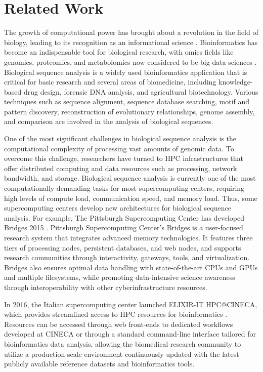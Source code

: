 \documentclass[conference]{IEEEtran}
\begin{document}
\section*{\textbf{Related Work}}
The growth of computational power has brought about a revolution in the field of biology, leading to its recognition as an informational science \cite{b4}. Bioinformatics has become an indispensable tool for biological research, with omics fields like genomics, proteomics, and metabolomics now considered to be big data sciences \cite{b5}. Biological sequence analysis is a widely used bioinformatics application that is critical for basic research and several areas of biomedicine, including knowledge-based drug design, forensic DNA analysis, and agricultural biotechnology. Various techniques such as sequence alignment, sequence database searching, motif and pattern discovery, reconstruction of evolutionary relationships, genome assembly, and comparison are involved in the analysis of biological sequences.

One of the most significant challenges in biological sequence analysis is the computational complexity of processing vast amounts of genomic data. To overcome this challenge, researchers have turned to HPC infrastructures that offer distributed computing and data resources such as processing, network bandwidth, and storage. Biological sequence analysis is currently one of the most computationally demanding tasks for most supercomputing centers, requiring high levels of compute load, communication speed, and memory load. Thus, some supercomputing centers develop new architectures for biological sequence analysis. For example, The Pittsburgh Supercomputing Center has developed Bridges 2015 \cite{b6}. Pittsburgh Supercomputing Center's Bridges is a user-focused research system that integrates advanced memory technologies. It features three tiers of processing nodes, persistent databases, and web nodes, and supports research communities through interactivity, gateways, tools, and virtualization. Bridges also ensures optimal data handling with state-of-the-art CPUs and GPUs and multiple filesystems, while promoting data-intensive science awareness through interoperability with other cyberinfrastructure resources.

In 2016, the Italian supercomputing center launched ELIXIR-IT HPC@CINECA, which provides streamlined access to HPC resources for bioinformatics \cite{b7}. Resources can be accessed through web front-ends to dedicated workflows developed at CINECA or through a standard command-line interface tailored for bioinformatics data analysis, allowing the biomedical research community to utilize a production-scale environment continuously updated with the latest publicly available reference datasets and bioinformatics tools.
\end{document}
